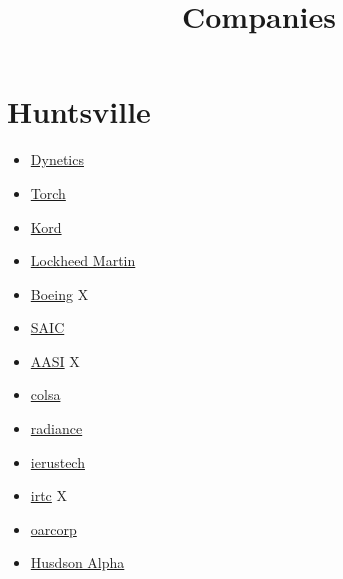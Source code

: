 \documentclass[10pt]{extarticle}
\title{Companies}
\begin{document}
\maketitle
\noindent
\section{Huntsville}

\begin{itemize}
	\item  \href{https://www.dynetics.com/?utm_source=zippia}{Dynetics}
	\item \href{https://www.torchtechnologies.com/?utm_source=zippia}{Torch}
	\item \href{https://kordtechnologies.com/}{Kord}
	\item \href{https://www.lockheedmartin.com/en-us/index.html?utm_source=zippia}{Lockheed Martin}
	\item \href{http://www.boeing.com/?utm_source=zippia}{Boeing} X
	\item \href{http://www.saic.com/?utm_source=zippia}{SAIC}
	\item \href{http://applied-analytical.com/}{AASI} X
	\item \href{https://www.colsa.com/}{colsa}
	\item \href{https://www.radiancetech.com/}{radiance}
	\item \href{https://www.ierustech.com/}{ierustech}
	\item \href{https://www.irtc-hq.com/}{irtc} X
	\item \href{http://www.oarcorp.com/}{oarcorp}
	\item \href{https://hudsonalpha.org/}{Husdson Alpha}
	
\end{itemize}
\end{document}
